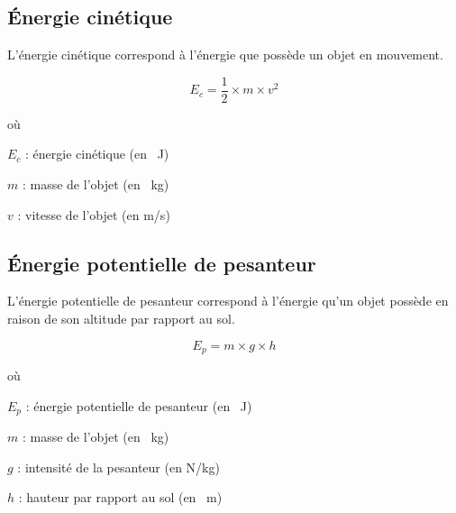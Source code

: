 \documentclass[answers]{exam}
\begin{document}
\begin{questions}
\begin{solution}
    \subsection*{Énergie cinétique}
  
    L'énergie cinétique correspond à l'énergie que possède un objet en mouvement.
  
    \[
    E_c = \frac{1}{2} \times m \times v^2
    \]
  
    où 
  
    \begin{addmargin}[4em]{1em}
      \begin{compactitem}
          \item [$E_c$] : énergie cinétique (en \SI{}{\joule})
          \item [$m$] : masse de l’objet (en \SI{}{\kilogram})
          \item [$v$] : vitesse de l’objet (en \unit[per-mode = symbol]{\meter\per\second}) %
      \end{compactitem}
    \end{addmargin}
  
    \subsection*{Énergie potentielle de pesanteur}
  
    L’énergie potentielle de pesanteur correspond à l’énergie qu’un objet possède en raison de son altitude par rapport au sol.
  
    \[
    E_p = m \times g \times h
    \]
  
    où 
  
    \begin{addmargin}[4em]{1em}
      \begin{compactitem}
          \item [$E_p$] : énergie potentielle de pesanteur (en \SI{}{\joule})
          \item [$m$] : masse de l’objet (en \SI{}{\kilogram})
          \item [$g$] : intensité de la pesanteur (en \unit[per-mode = symbol]{\newton\per\kilogram}) %
          \item [$h$] : hauteur par rapport au sol (en \SI{}{\meter})
      \end{compactitem}
    \end{addmargin}
  
    \end{solution}
\end{questions}
\end{document}
